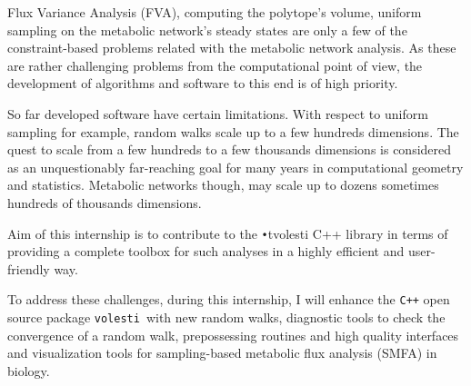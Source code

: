 \documentclass[a4paper, 12pt]{article}
\def\volesti{{\tt volesti}}
\begin{document}
Flux Variance Analysis (FVA), computing the polytope's volume, uniform sampling on the metabolic network's steady states are only a few of the constraint-based problems related with the metabolic network analysis. As these are rather challenging problems from the computational point of view, the development of algorithms and software to this end is of high priority.

So far developed software have certain limitations. With respect to uniform sampling for example, random walks scale up to a few hundreds dimensions. The quest to scale from a few hundreds to a few thousands dimensions is
considered as an unquestionably far-reaching goal for many years in computational geometry and statistics. Metabolic networks though, may scale up to dozens sometimes hundreds of thousands dimensions.

Aim of this internship is to contribute to the \texttt{•}t{volesti} C++ library in terms of providing a complete toolbox for such analyses in a highly efficient and user-friendly way.

To address these challenges, during this internship, I will enhance the {\tt C++} open source package \volesti\ with new random walks, diagnostic tools to check the convergence of a random walk, prepossessing routines and high quality interfaces and visualization tools for sampling-based metabolic flux analysis (SMFA) in biology. 




\end{document}
